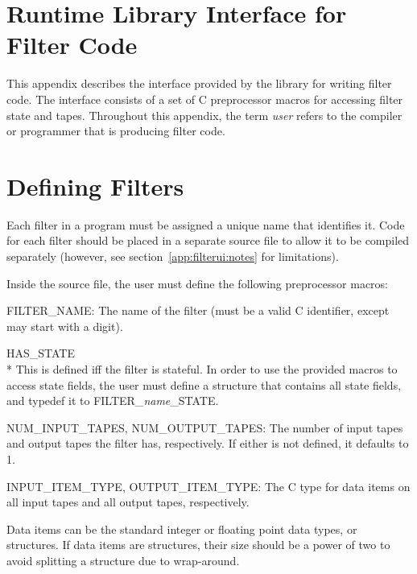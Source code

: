 \section{Runtime Library Interface for Filter Code}\label{app:filterui}

This appendix describes the interface provided by the library for writing filter code. The interface consists of a set of C preprocessor macros for accessing filter state and tapes. Throughout this appendix, the term \emph{user} refers to the compiler or programmer that is producing filter code.

\section{Defining Filters}

Each filter in a program must be assigned a unique name that identifies it. Code for each filter should be placed in a separate source file to allow it to be compiled separately (however, see section~\ref{app:filterui:notes} for limitations).

Inside the source file, the user must define the following preprocessor macros:
\begin{description}
\item \textsf{FILTER\_NAME}: The name of the filter (must be a valid C identifier, except may start with a digit).

\item \textsf{HAS\_STATE}~\\*
This is defined iff the filter is stateful. In order to use the provided macros to access state fields, the user must define a structure that contains all state fields, and \textsf{typedef} it to \textsf{FILTER\_\emph{name}\_STATE}.

\item \textsf{NUM\_INPUT\_TAPES}, \textsf{NUM\_OUTPUT\_TAPES}: The number of input tapes and output tapes the filter has, respectively. If either is not defined, it defaults to 1.

\item \textsf{INPUT\_ITEM\_TYPE}, \textsf{OUTPUT\_ITEM\_TYPE}: The C type for data items on all input tapes and all output tapes, respectively.

Data items can be the standard integer or floating point data types, or structures. If data items are structures, their size should be a power of two to avoid splitting a structure due to wrap-around.
\end{description}

